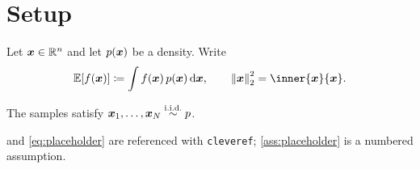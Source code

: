\documentclass[../main.tex]{subfiles}
\begin{document}
\section{Setup}
\label{sec:setup}


\begin{definition}[Placeholder]
\label{def:placeholder}
Let $\bm{x} \in \mathbb{R}^{n}$ and let $p(\bm{x})$ be a density. Write
\begin{equation}
\label{eq:placeholder}
  \E[f(\vb{x})] \defeq \int f(\vb{x})\, p(\vb{x}) \,\dd\vb{x},
  \qquad
  \norm*{\vb{x}}_{2}^{2} = \inner{\vb{x}}{\vb{x}}.
\end{equation}
\end{definition}

\begin{assumption}
\label{ass:placeholder}
The samples satisfy $\bm{x}_{1}, \dots, \bm{x}_{N} \overset{\text{i.i.d.}}{\sim} p$.
\end{assumption}

 and \cref{eq:placeholder} are referenced with
\texttt{cleveref}; \cref{ass:placeholder} is a numbered assumption.
\end{document}
